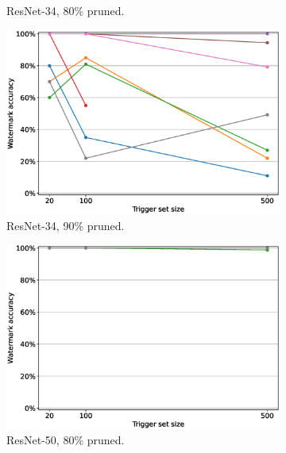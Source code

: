 \begin{figure}
\begin{subfigure}{0.4\linewidth}
        \caption{ResNet-34, 80\% pruned.}
        \label{fig:pruning-0.8-resnet34}
    \end{subfigure}
    \quad
    \begin{subfigure}{0.4\linewidth}
        \includegraphics[width=\linewidth]{images/pruning/resnet34_pruning_per_arch_09.eps}
        \caption{ResNet-34, 90\% pruned.}
        \label{fig:pruning-0.9-resnet34}
    \end{subfigure}
    \quad
    \begin{subfigure}{0.4\linewidth}
        \includegraphics[width=\linewidth]{images/pruning/resnet50_pruning_per_arch_08.eps}
        \caption{ResNet-50, 80\% pruned.}
        \label{fig:pruning-0.8-resnet50}
    \end{subfigure}
    \quad
    \begin{subfigure}{0.4\linewidth}

\end{subfigure}
\end{figure}
